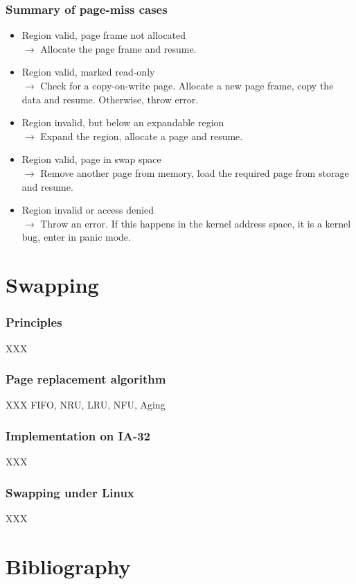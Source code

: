 
\begin{frame}
  \frametitle{Summary of page-miss cases}

  \begin{itemize}
  \item
  Region valid, page frame not allocated\\
  $\rightarrow$ Allocate the page frame and resume.
  \item
  Region valid, marked read-only\\
  $\rightarrow$ Check for a copy-on-write page. Allocate a new page
  frame, copy the data and resume. Otherwise, throw error.
  \item
  Region invalid, but below an expandable region\\
  $\rightarrow$ Expand the region, allocate a page and resume.
  \item
  Region valid, page in swap space\\
  $\rightarrow$ Remove another page from memory, load the required
  page from storage and resume.
  \item
  Region invalid or access denied\\
  $\rightarrow$ Throw an error. If this happens in the kernel address
  space, it is a kernel bug, enter in panic mode.
  \end{itemize}

\end{frame}

%
%

\section{Swapping}


\begin{frame}
  \frametitle{Principles}

  XXX
\end{frame}


\begin{frame}
  \frametitle{Page replacement algorithm}

  XXX FIFO, NRU, LRU, NFU, Aging
\end{frame}


\begin{frame}
  \frametitle{Implementation on IA-32}

  XXX
\end{frame}


\begin{frame}
  \frametitle{Swapping under Linux}

  XXX
\end{frame}

%
%

\section{Bibliography}

\begin{thebibliography}{4}


\end{thebibliography}


